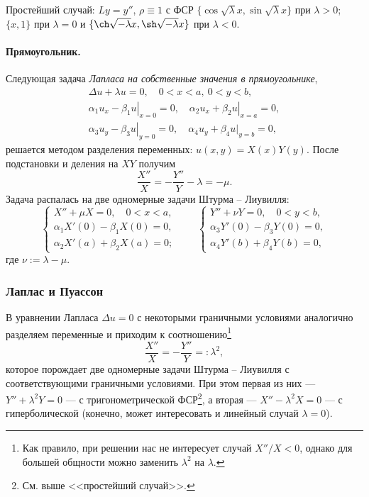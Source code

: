 Простейший случай: $ Ly = y'' $, $ \rho \equiv 1 $ с ФСР $
\{\cos\sqrt\lambda x, \sin\sqrt\lambda x\} $ при $ \lambda > 0 $; $ \{x, 1\} $
при $ \lambda = 0 $ и $ \{\ch\sqrt{-\lambda}x, \sh\sqrt{-\lambda}x\} $ при $
\lambda < 0 $.



\paragraph{Прямоугольник.}
Следующая задача \emph{Лапласа на собственные значения в прямоугольнике},  
\begin{gather*}
    \Delta u + \lambda u = 0, \quad 0 < x < a, \ 0 < y < b,\\
    \left.\alpha_1u_x - \beta_1u\right|_{x=0} = 0, \quad \left.\alpha_2u_x +
      \beta_2u\right|_{x=a} = 0,\\
      \left.\alpha_3 u_y - \beta_3u\right|_{y=0} = 0, \quad \left.\alpha_4u_y +
        \beta_4 u|_{y=b} = 0,
\end{gather*}
решается методом разделения переменных: $ u(x, y) = X(x)Y(y) $. После
подстановки и деления на $ XY $ получим 
\[
    \frac{X''}{X} = - \frac{Y''}{Y} - \lambda = -\mu.
\]
Задача распалась на две одномерные задачи Штурма -- Лиувилля: 
\[
  \begin{cases}
    X'' + \mu X = 0, \quad 0 < x < a,\\
    \alpha_1 X'(0) - \beta_1 X(0) = 0,\\
    \alpha_2 X'(a) + \beta_2 X(a) = 0;
  \end{cases} \qquad
  \begin{cases}
    Y'' + \nu Y = 0, \quad 0 < y < b,\\
    \alpha_3 Y'(0) - \beta_3 Y(0) = 0,\\
    \alpha_4 Y'(b) + \beta_4 Y(b) = 0,
  \end{cases}
\]
где $ \nu := \lambda - \mu $.

\subsubsection{Лаплас и Пуассон}
В уравнении Лапласа $ \Delta u = 0 $ с некоторыми граничными условиями
аналогично разделяем переменные и приходим к соотношению\footnote{Как правило,
  при решении нас не интересует случай $ X''/X < 0 $, однако для большей
  общности можно заменить $
\lambda^2 $ на $ \lambda $.}
\[
  \frac{X''}{X} = - \frac{Y''}{Y} =: \lambda^2,  
\]
которое порождает две одномерные задачи Штурма -- Лиувилля с соответствующими
граничными условиями. При этом первая из них --- $ Y'' + \lambda^2Y = 0 $ --- с
тригонометрической ФСР\footnote{См. выше <<простейший
случай>>.}, а вторая --- $ X'' - \lambda^2X = 0 $ --- с гиперболической (конечно,
может интересовать и линейный случай $ \lambda = 0 $).

